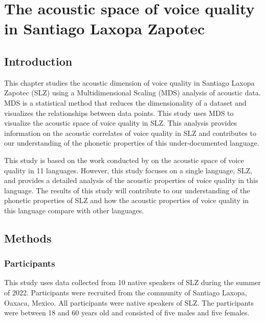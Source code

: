 \chapter{The acoustic space of voice quality in Santiago Laxopa Zapotec} \label{ch:acousticlandscape}

\section{Introduction} \label{sec:acousticlandscape:intro}

This chapter studies the acoustic dimension of voice quality in Santiago Laxopa Zapotec (SLZ) using a Multidimensional Scaling (MDS) analysis of acoustic data. MDS is a statistical method that reduces the dimensionality of a dataset and visualizes the relationships between data points. This study uses MDS to visualize the acoustic space of voice quality in SLZ. This analysis provides information on the acoustic correlates of voice quality in SLZ and contributes to our understanding of the phonetic properties of this under-documented language.

This study is based on the work conducted by \citet{keatingCrosslanguageAcousticSpace2023} on the acoustic space of voice quality in 11 languages. However, this study focuses on a single language, SLZ, and provides a detailed analysis of the acoustic properties of voice quality in this language. The results of this study will contribute to our understanding of the phonetic properties of SLZ and how the acoustic properties of voice quality in this language compare with other languages.

\section{Methods} \label{sec:acousticlandscape:methods}
\subsection{Participants} \label{sec:acousticlandscape:participants}
This study uses data collected from 10 native speakers of SLZ during the summer of 2022. Participants were recruited from the community of Santiago Laxopa, Oaxaca, Mexico. All participants were native speakers of SLZ. The participants were between 18 and 60 years old and consisted of five males and five females.
